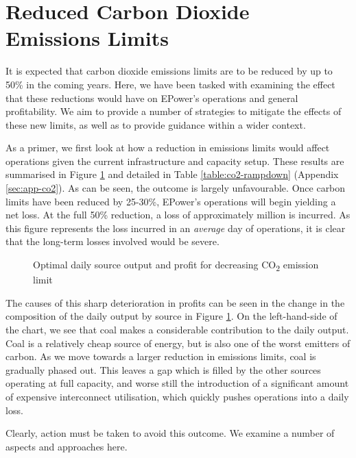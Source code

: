 \documentclass[twocolumn]{article}
\begin{document}
    
    
    \section{Reduced Carbon Dioxide Emissions Limits}
    
    It is expected that carbon dioxide emissions limits are to be reduced by up to 50\% in the coming years.  Here, we have been tasked with examining the effect that these reductions would have on EPower's operations and general profitability. We aim to provide a number of strategies to mitigate the effects of these new limits, as well as to provide guidance within a wider context.
    
    As a primer, we first look at how a reduction in emissions limits would affect operations given the current infrastructure and capacity setup.  These results are summarised in Figure \ref{fig:co2rampdown} and detailed in Table \ref{table:co2-rampdown} (Appendix \ref{sec:app-co2}). As can be seen, the outcome is largely unfavourable. Once carbon limits have been reduced by 25-30\%, EPower's operations will begin yielding a net loss.  At the full 50\% reduction, a loss of approximately  million is incurred.  As this figure represents the loss incurred in an \textit{average} day of operations, it is clear that the long-term losses involved would be severe.
    
     \begin{figure}[ht!] 
        \centering
        \chartrampdown
    	\caption{Optimal daily source output and profit for decreasing CO\textsubscript{2} emission limit\label{fig:co2rampdown}}
    \end{figure}
    
    The causes of this sharp deterioration in profits can be seen in the change in the composition of the daily output by source in Figure \ref{fig:co2rampdown}.  On the left-hand-side of the chart, we see that coal makes a considerable contribution to the daily output.  Coal is a relatively cheap source of energy, but is also one of the worst emitters of carbon.  As we move towards a larger reduction in emissions limits, coal is gradually phased out.  This leaves a gap which is filled by the other sources operating at full capacity, and worse still the introduction of a significant amount of expensive interconnect utilisation, which quickly pushes operations into a daily loss.
    
    Clearly, action must be taken to avoid this outcome.  We examine a number of aspects and approaches here.
    
\end{document}
